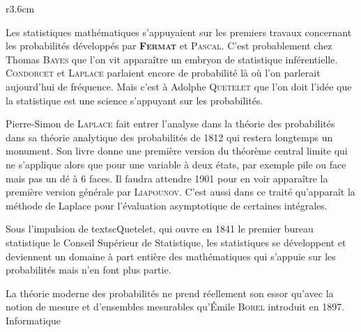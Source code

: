 \begin{His}
\begin{wrapfigure}[15]{r}{3.6cm}
\end{wrapfigure}

Les statistiques mathématiques s'appuyaient sur les premiers travaux concernant les probabilités développés par \textsc{\textbf{Fermat}} et \textsc{Pascal}. C'est probablement chez Thomas \textsc{Bayes} que l'on vit apparaître un embryon de statistique inférentielle. \textsc{Condorcet} et \textsc{Laplace} parlaient encore de probabilité là où l'on parlerait aujourd'hui de fréquence. Mais c'est à Adolphe \textsc{Quetelet} que l'on doit l'idée que la statistique est une science s'appuyant sur les probabilités.

Pierre-Simon de \textsc{Laplace} fait entrer l'analyse dans la théorie des probabilités dans sa théorie analytique des probabilités de 1812 qui restera longtemps un monument. Son livre donne une première version du théorème central limite qui ne s'applique alors que pour une variable à deux états, par exemple pile ou face mais pas un dé à 6 faces. Il faudra attendre 1901 pour en voir apparaître la première version générale par \textsc{Liapounov}. C'est aussi dans ce traité qu'apparaît la méthode de Laplace pour l'évaluation asymptotique de certaines intégrales.

Sous l'impulsion de textsc{Quetelet}, qui ouvre en 1841 le premier bureau statistique le Conseil Supérieur de Statistique, les statistiques se développent et deviennent un domaine à part entière des mathématiques qui s'appuie sur les probabilités mais n'en font plus partie.

La théorie moderne des probabilités ne prend réellement son essor qu'avec la notion de mesure et d'ensembles mesurables qu'Émile \textsc{Borel} introduit en 1897.
Informatique
 
 
\end{His}